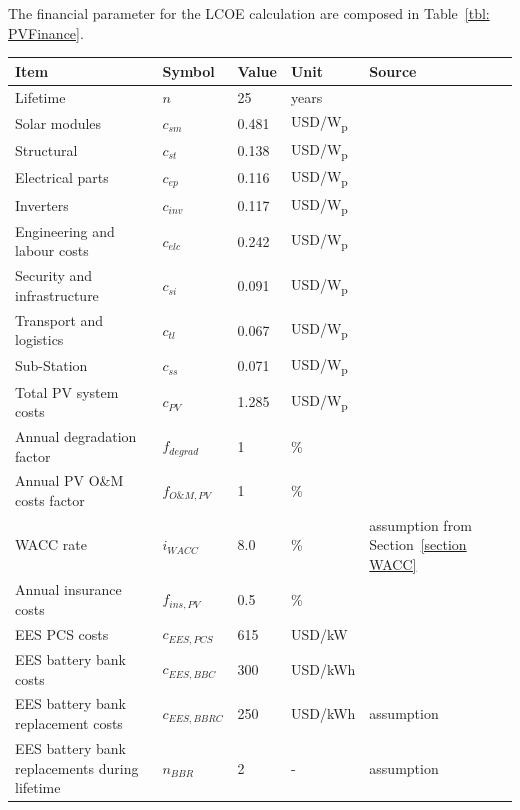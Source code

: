 The financial parameter for the LCOE calculation are composed in Table~\ref{tbl: PVFinance}.
\pagebreak
\begin{table}[!h]  
  \centering
	\begin{tabular}{  p{5.4cm} C{1.5cm} C{1.5cm}  C{1.7cm}  C{4.0cm} } 
	\hline	
\textbf{Item} & \textbf{Symbol}& \textbf{Value} & \textbf{Unit} & \textbf{Source}\\ \hline \hline
Lifetime &$n$ & 25 & years & \cite{FraunhoferISE2013} \\ \hline
Solar modules & $c_{sm}$&0.481 & USD/W\textsubscript{p} & \cite{Terblanche2015}\\ 
Structural &$c_{st}$ &0.138 & USD/W\textsubscript{p} & \cite{Terblanche2015} \\ 
Electrical parts &$c_{ep}$ &0.116 & USD/W\textsubscript{p} & \cite{Terblanche2015} \\ 
Inverters&$c_{inv}$ &0.117 & USD/W\textsubscript{p} & \cite{Terblanche2015} \\ 
Engineering and labour costs & $c_{elc}$ & 0.242 & USD/W\textsubscript{p} & \cite{Terblanche2015} \\ 
Security and infrastructure & $c_{si}$& 0.091 & USD/W\textsubscript{p} & \cite{Terblanche2015} \\ 
Transport and logistics & $c_{tl}$& 0.067 & USD/W\textsubscript{p} & \cite{Terblanche2015}\\ 
Sub-Station & $c_{ss}$ & 0.071 & USD/W\textsubscript{p} &\cite{Terblanche2015} \\ \hline
Total PV system costs & $c_{PV}$ & 1.285 &  USD/W\textsubscript{p} &\cite{Terblanche2015} \\ 
Annual degradation factor &$f_{degrad}$ & 1 & \% & \cite{Tidball2010}\\ 
Annual PV O\&M costs factor &$f_{O\&M,PV}$ & 1 & \% & \cite{IEA2014a}\\
WACC rate & $i_{WACC}$ & 8.0 & \si{\percent} & assumption from Section~\ref{section WACC} \\ 
Annual insurance costs & $f_{ins,PV}$ & 0.5 & \% & \cite{InternationalFinanceCorporation2015}\\ \hline
EES PCS costs & $c_{EES,PCS}$ & 615 & USD/kW & \cite{Zakeri2015} \\ 
EES battery bank costs & $c_{EES,BBC}$ &300 & USD/kWh & \cite{Nykvist2015} \\ 
EES battery bank replacement costs & $c_{EES,BBRC}$ & 250 & USD/kWh & assumption \\ 
EES battery bank replacements during lifetime & $n_{BBR}$ & 2 & - & assumption \\ 

\end{tabular}
\end{table}
